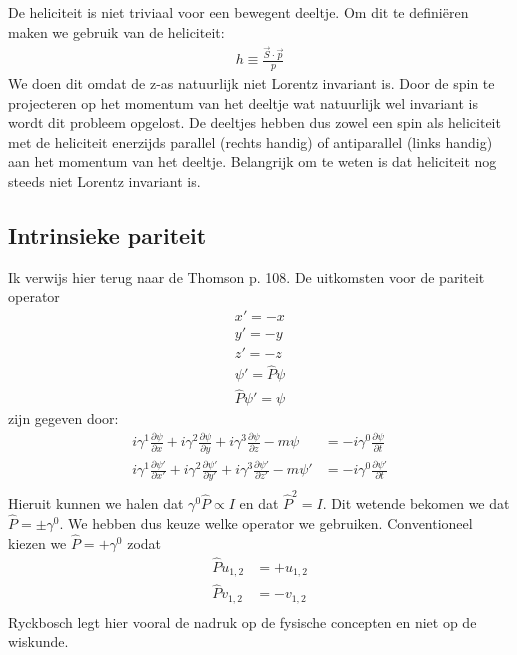 \documentclass[../main.tex]{subfiles}
\begin{document}
De heliciteit is niet triviaal voor een bewegent deeltje. Om dit te definiëren maken we gebruik van de heliciteit:
\begin{equation}
    \begin{aligned}
        \label{eq:heliciteit}
        h \equiv \frac{\vec{S}\cdot\vec{p}}{p} 
    \end{aligned}
\end{equation}
We doen dit omdat de z-as natuurlijk niet Lorentz invariant is. Door de spin te projecteren op het momentum van het deeltje wat natuurlijk wel invariant is wordt dit probleem opgelost. De deeltjes hebben dus zowel een spin als heliciteit met de heliciteit enerzijds parallel (rechts handig) of antiparallel (links handig) aan het momentum van het deeltje. Belangrijk om te weten is dat heliciteit nog steeds niet Lorentz invariant is.

\subsection{Intrinsieke pariteit}%
\label{sub:intrinsieke_pariteit}

Ik verwijs hier terug naar de Thomson p. 108. De uitkomsten voor de pariteit operator
\begin{equation}
    \begin{aligned}
        \label{eq:dirac_par_op}
        x'=-x\\
        y'=-y\\
        z'=-z\\
        \psi'=\hat{P}\psi\\
        \hat{P}\psi'=\psi
    \end{aligned}
\end{equation}
zijn gegeven door:
\begin{equation}
    \begin{aligned}
        \label{eq:dirac_int_par}
        i\gamma^1 \frac{\partial \psi}{\partial x} + i\gamma^2 \frac{\partial \psi}{\partial y} + i\gamma^3 \frac{\partial \psi}{\partial z} - m\psi &= -i\gamma^0 \frac{\partial \psi}{\partial t}\\
        i\gamma^1 \frac{\partial \psi'}{\partial x'} + i\gamma^2 \frac{\partial \psi'}{\partial y'} + i\gamma^3 \frac{\partial \psi'}{\partial z'} - m\psi' &= -i\gamma^0 \frac{\partial \psi'}{\partial t}\\
    \end{aligned}
\end{equation}
Hieruit kunnen we halen dat $\gamma^0\hat{P} \propto I$ en dat $\hat{P}^2=I$. Dit wetende bekomen we dat $\hat{P}=\pm\gamma^0$. We hebben dus keuze welke operator we gebruiken. Conventioneel kiezen we $\hat{P}=+\gamma^0$ zodat
\begin{equation}
    \begin{aligned}
        \label{eq:par_u_v}
        \hat{P}u_{1,2} &= +u_{1,2}\\
        \hat{P}v_{1,2} &= -v_{1,2}\\
    \end{aligned}
\end{equation}
Ryckbosch legt hier vooral de nadruk op de fysische concepten en niet op de wiskunde.
\end{document}
